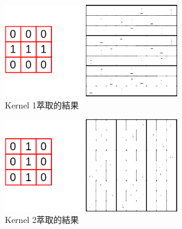 \begin{figure}[H]
	\centerline{\includegraphics[height=4cm]{./pic/rRdq44Ie.png}}
	\caption{Kernel 1萃取的結果}
	\label{fig:Kernel1Result}
\end{figure}

\begin{figure}[H]
	\centerline{\includegraphics[height=4cm]{./pic/0LHCpsTh.png}}
	\caption{Kernel 2萃取的結果}
	\label{fig:Kernel2Result}
\end{figure}

